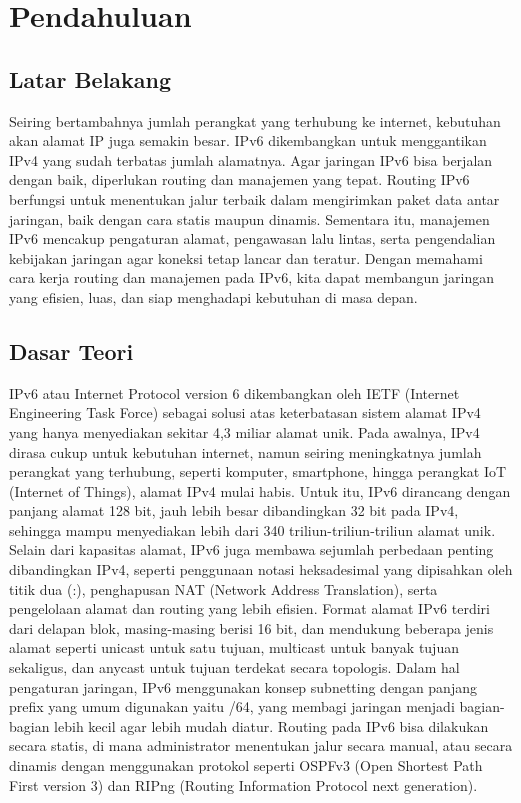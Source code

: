 \section{Pendahuluan}
\subsection{Latar Belakang}
Seiring bertambahnya jumlah perangkat yang terhubung ke internet, kebutuhan akan alamat IP juga semakin besar. IPv6 dikembangkan untuk menggantikan IPv4 yang sudah terbatas jumlah alamatnya. Agar jaringan IPv6 bisa berjalan dengan baik, diperlukan routing dan manajemen yang tepat. Routing IPv6 berfungsi untuk menentukan jalur terbaik dalam mengirimkan paket data antar jaringan, baik dengan cara statis maupun dinamis. Sementara itu, manajemen IPv6 mencakup pengaturan alamat, pengawasan lalu lintas, serta pengendalian kebijakan jaringan agar koneksi tetap lancar dan teratur. Dengan memahami cara kerja routing dan manajemen pada IPv6, kita dapat membangun jaringan yang efisien, luas, dan siap menghadapi kebutuhan di masa depan.

\subsection{Dasar Teori}
IPv6 atau Internet Protocol version 6 dikembangkan oleh IETF (Internet Engineering Task Force) sebagai solusi atas keterbatasan sistem alamat IPv4 yang hanya menyediakan sekitar 4,3 miliar alamat unik. Pada awalnya, IPv4 dirasa cukup untuk kebutuhan internet, namun seiring meningkatnya jumlah perangkat yang terhubung, seperti komputer, smartphone, hingga perangkat IoT (Internet of Things), alamat IPv4 mulai habis. Untuk itu, IPv6 dirancang dengan panjang alamat 128 bit, jauh lebih besar dibandingkan 32 bit pada IPv4, sehingga mampu menyediakan lebih dari 340 triliun-triliun-triliun alamat unik. Selain dari kapasitas alamat, IPv6 juga membawa sejumlah perbedaan penting dibandingkan IPv4, seperti penggunaan notasi heksadesimal yang dipisahkan oleh titik dua (:), penghapusan NAT (Network Address Translation), serta pengelolaan alamat dan routing yang lebih efisien. Format alamat IPv6 terdiri dari delapan blok, masing-masing berisi 16 bit, dan mendukung beberapa jenis alamat seperti unicast untuk satu tujuan, multicast untuk banyak tujuan sekaligus, dan anycast untuk tujuan terdekat secara topologis. Dalam hal pengaturan jaringan, IPv6 menggunakan konsep subnetting dengan panjang prefix yang umum digunakan yaitu /64, yang membagi jaringan menjadi bagian-bagian lebih kecil agar lebih mudah diatur. Routing pada IPv6 bisa dilakukan secara statis, di mana administrator menentukan jalur secara manual, atau secara dinamis dengan menggunakan protokol seperti OSPFv3 (Open Shortest Path First version 3) dan RIPng (Routing Information Protocol next generation). 

